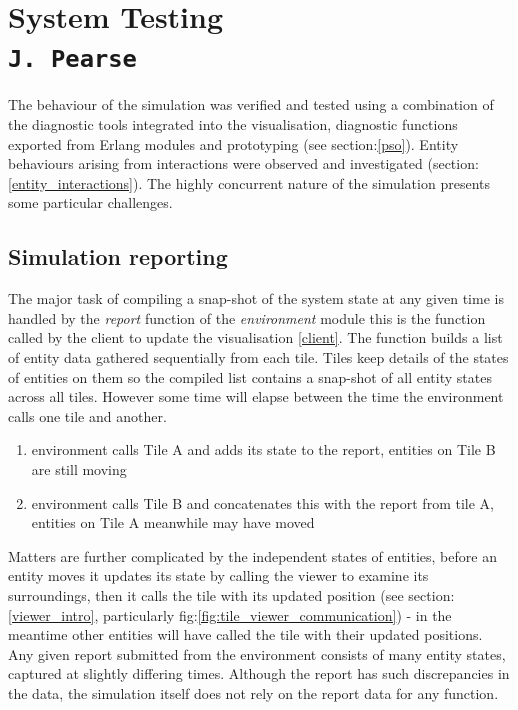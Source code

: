 \pagestyle{empty}
\section{System Testing \\{\small\tt{J.~Pearse}}}
The behaviour of the simulation was verified and tested using a combination of the diagnostic tools integrated into the visualisation, diagnostic functions exported from Erlang modules and prototyping (see section:\ref{pso}). Entity behaviours arising from interactions were observed and investigated (section:\ref{entity_interactions}). The highly concurrent nature of the simulation presents some particular challenges.

\subsection{Simulation reporting}
The major task of compiling a snap-shot of the system state at any given time is handled by the \emph{report} function of the \emph{environment} module this is the function called by the client to update the visualisation \ref{client}.
The function builds a list of entity data gathered sequentially from each tile. Tiles keep details of the states of entities on them so the compiled list contains a snap-shot of all entity states across all tiles. However some time will elapse between the time the environment calls one tile and another.
\begin{enumerate}
\item{environment calls Tile A and adds its state to the report, entities on Tile B are still moving}
\item{environment calls Tile B and concatenates this with the report from tile A, entities on Tile A meanwhile may have moved}
\end{enumerate}
Matters are further complicated by the independent states of entities, before an entity moves it updates its state by calling the viewer to examine its surroundings, then it calls the tile with its updated position (see section:\ref{viewer_intro}, particularly fig:\ref{fig:tile_viewer_communication})  - in the meantime other entities will have called the tile with their updated positions.
Any given report submitted from the environment consists of many entity states, captured at slightly differing times. Although the report has such discrepancies in the data, the simulation itself does not rely on the report data for any function.
